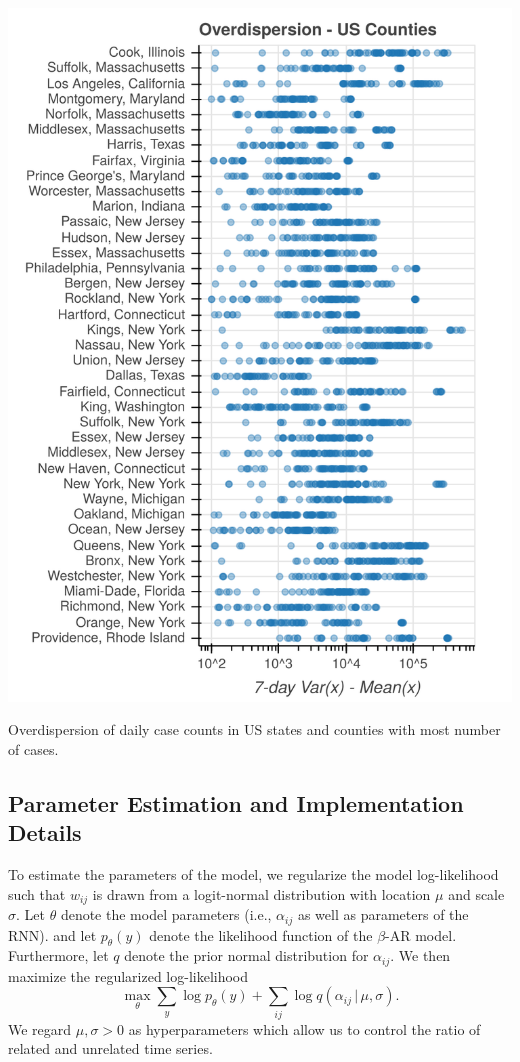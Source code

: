 \documentclass[nobib]{tufte-handout}
\newcommand{\bAR}{\ensuremath{\beta}\text{-AR}\xspace}
\begin{document}
\begin{marginfigure}[5em]
\hspace{0em}%
\includegraphics[width=\columnwidth]{img/overdispersion_counties.png}
\caption{Overdispersion of daily case counts in US states and counties with most number of cases.}
\label{fig:dispersion}
\end{marginfigure}

\subsection{Parameter Estimation and Implementation Details}
\label{sec:org9e86a8e}
To estimate the parameters of the model, we regularize the
model log-likelihood such that \(w_{ij}\) is drawn from a logit-normal
distribution with location \(\mu\) and scale \(\sigma\). Let \(\theta\) denote
the model parameters (i.e., \(\alpha_{ij}\) as well as parameters of the RNN).
and let \(p_\theta(y)\) denote the likelihood function of the \(\bAR\)
model. Furthermore, let \(q\) denote the prior normal
distribution for \(\alpha_{ij}\). We then maximize the regularized log-likelihood
\begin{equation}
\max_{\theta}\sum_y\log p_\theta(y) + \sum_{ij} \log q(\alpha_{ij}\,|\,\mu,\sigma). \label{eq:objective}
\end{equation}
We regard \(\mu, \sigma > 0\) as hyperparameters which allow us to control the
ratio of related and unrelated time series.
\end{document}
